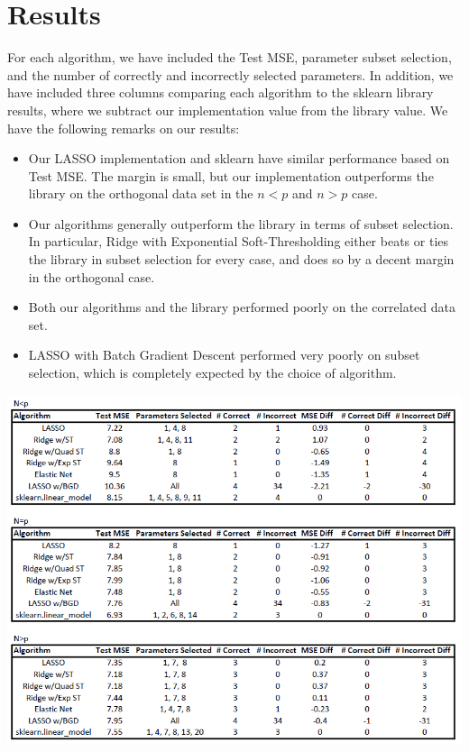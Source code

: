 \documentclass[11pt]{article}
\begin{document}
\section{Results}
For each algorithm, we have included the Test MSE, parameter subset selection, and the number of correctly and incorrectly selected parameters.  In addition, we have included three columns comparing each algorithm to the sklearn library results, where we subtract our implementation value from the library value.  We have the following remarks on our results:
\begin{itemize}
	\item Our LASSO implementation and sklearn have similar performance based on Test MSE.  The margin is small, but our implementation outperforms the library on the orthogonal data set in the $n<p$ and $n>p$ case.  
	\item Our algorithms generally outperform the library in terms of subset selection.  In particular, Ridge with Exponential Soft-Thresholding either beats or ties the library in subset selection for every case, and does so by a decent margin in the orthogonal case.  
	\item Both our algorithms and the library performed poorly on the correlated data set.  
	\item LASSO with Batch Gradient Descent performed very poorly on subset selection, which is completely expected by the choice of algorithm.  
\end{itemize}

\begin{center}
\includegraphics[scale=0.7]{ortho.PNG}
\end{center}
\end{document}
